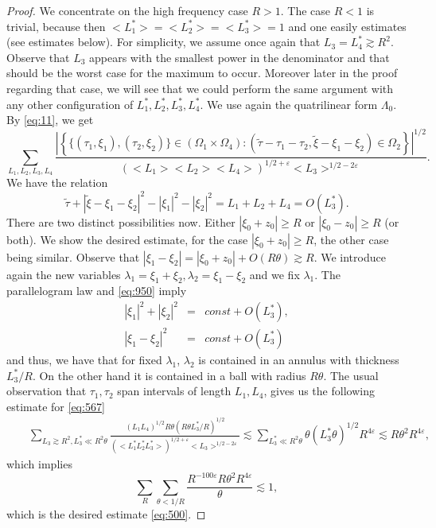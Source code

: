 \documentclass[draft,11pt,leqno]{amsart}
\newcommand{\ve}{\varepsilon}
\newcommand{\la}{\lambda}
\newcommand{\La}{\Lambda}
\newcommand{\Om}{\Omega}
\newcommand{\suml}{\sum\limits}
\newcommand{\f}{\displaystyle\frac}
\newcommand{\lone}{{L_1^{*}}}
\newcommand{\ltwo}{{L_2^{*}}}
\newcommand{\lthree}{{L_3^{*}}}
\newcommand{\lfour}{{L_4^{*}}}
\begin{document}
\begin{proof}
We concentrate on the high frequency case $R>1$. The case $R<1$ is 
trivial, because then $<\lone>=<\ltwo>=<\lthree>=1$ and one easily 
estimates (see estimates below).
For simplicity, we assume once again that $L_3=\lfour\gtrsim R^2$. Observe that $L_3$ appears with the smallest
power in the denominator and that should be the worst case for the maximum to occur. Moreover later in 
the proof regarding that case, we will see that we could perform the same argument with any other configuration
of $\lone, \ltwo, \lthree, \lfour$.
We use again the quatrilinear form $\La_0$. By \eqref{eq:11}, we  get
\begin{equation}
\label{eq:567}
\suml_{L_1,L_2,L_3,L_4}\f{\left|
\left\{\{(\tau_1,\xi_1),(\tau_2,\xi_2)\}\in(\Om_1\times\Om_4):(\tilde{\tau}-\tau_1-\tau_2,
\tilde{\xi}-\xi_1-\xi_2)\in
\Om_2\right\}\right|^{1/2}}{(<L_1><L_2><L_4>)^{1/2+\ve}<L_3>^{1/2-2\ve}}.
\end{equation}
We have the relation 
\begin{equation}
\label{eq:950}
\tilde{\tau}+|\tilde{\xi}-\xi_1-\xi_2|^2-|\xi_1|^2-|\xi_2|^2=L_1+L_2+L_4=O(\lthree).
\end{equation}
There are two distinct possibilities now. Either $|\xi_0+z_0|\geq R$ or $|\xi_0-z_0|\geq R$ (or both). We
show  the desired estimate, for the case $|\xi_0+z_0|\geq R$, the other case being similar.
Observe that $|\xi_1-\xi_2|=|\xi_0+z_0|+O(R\theta)\gtrsim R$. We introduce again the 
new variables $\la_1=\xi_1+\xi_2, \la_2=\xi_1-\xi_2$ and we fix $\la_1$. The parallelogram law and \eqref{eq:950} imply
\begin{eqnarray*}
|\xi_1|^2+|\xi_2|^2 &=& const+O(\lthree),\\
|\xi_1-\xi_2|^2 &=& const+O(\lthree)
\end{eqnarray*}
and thus, we have that for fixed $\la_1$, $\la_2$ is contained in an annulus with thickness $\lthree/R$. On the 
other hand it is contained in a ball with radius $R\theta$. The usual observation that $\tau_1, \tau_2$ span 
intervals of length $L_1, L_4$, gives us the following estimate for \eqref{eq:567}
\begin{eqnarray*}
& &\suml_{L_3\gtrsim R^2, \lthree\ll R^2\theta}\f{(L_1L_4)^{1/2}R\theta( R\theta \lthree/R)^{1/2}}
{(<\lone\ltwo\lthree>)^{1/2+\ve} <L_3>^{1/2-2\ve}}\lesssim 
\suml_{\lthree\ll R^2\theta}\theta (\lthree\theta)^{1/2} R^{4\ve}\lesssim R\theta^2 R^{4\ve},
\end{eqnarray*}
which implies 
$$
\suml_{R} \suml_{\theta<1/R} \f{R^{-100\ve} R\theta^2 R^{4\ve}}{\theta}\lesssim 1,
$$
which is the desired estimate \eqref{eq:500}.
\end{proof}
\end{document}
